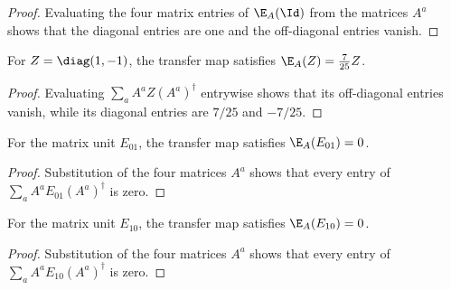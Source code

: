 \begin{proof}\leanok
    Evaluating the four matrix entries of $\E_A(\Id)$ from the
    matrices $A^a$ shows that the diagonal entries are one and the
    off-diagonal entries vanish.
\end{proof}

\begin{lemma}%
    \label{thm:mpdo_rescaling_transfer_diag_alt}
    \leanok
    For $Z=\diag(1,-1)$, the transfer map satisfies
    $\E_A(Z)=\frac{7}{25}Z$.
\end{lemma}

\begin{proof}\leanok
    Evaluating $\sum_a A^aZ(A^a)^\dagger$ entrywise shows that its
    off-diagonal entries vanish, while its diagonal entries are $7/25$ and
    $-7/25$.
\end{proof}

\begin{lemma}%
    \label{thm:mpdo_rescaling_transfer_single_zero_one}
    \leanok
    For the matrix unit $E_{01}$, the transfer map satisfies
    $\E_A(E_{01})=0$.
\end{lemma}

\begin{proof}\leanok
    Substitution of the four matrices $A^a$ shows that every entry of
    $\sum_a A^aE_{01}(A^a)^\dagger$ is zero.
\end{proof}

\begin{lemma}%
    \label{thm:mpdo_rescaling_transfer_single_one_zero}
    \leanok
    For the matrix unit $E_{10}$, the transfer map satisfies
    $\E_A(E_{10})=0$.
\end{lemma}

\begin{proof}\leanok
    Substitution of the four matrices $A^a$ shows that every entry of
    $\sum_a A^aE_{10}(A^a)^\dagger$ is zero.
\end{proof}

